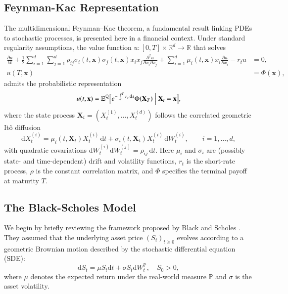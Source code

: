 \documentclass[12pt]{report} %
\theoremstyle{plain}           %
\theoremstyle{definition}      %
\theoremstyle{remark}          %
\begin{document}
\subsection{Feynman-Kac Representation}\label{sec:feynman_kac}

The multidimensional Feynman--Kac theorem, a fundamental result linking PDEs to 
stochastic processes, is presented here in a financial context.
Under standard regularity assumptions, the value function \(u:[0,T]\times\mathbb R^d\to\mathbb R\) that solves
\begin{equation}\label{eq:fk_pde_multi}
	\begin{aligned}
		\frac{\partial u}{\partial t}
		+ \frac{1}{2}\sum_{i=1}^{d}\sum_{j=1}^{d}
		    \rho_{ij}\sigma_i(t,\mathbf x)\sigma_j(t,\mathbf x)x_i x_j
		    \frac{\partial^{2}u}{\partial x_i\partial x_j}
		+ \sum_{i=1}^{d}\mu_i(t,\mathbf x)x_i\frac{\partial u}{\partial x_i}
		- r_t u &= 0,\\
		u(T,\mathbf x)&=\Phi(\mathbf x),
	\end{aligned}
\end{equation}
admits the probabilistic representation
\begin{equation}\label{eq:feynman_kac}
	u(t,\mathbf x)=
	\mathbb E^{\mathbb Q}\Bigl[
		e^{-\int_t^{T} r_s\,\mathrm ds}
		\Phi(\mathbf X_T)
		\Bigm| \mathbf X_t=\mathbf x
	\Bigr],
\end{equation}
where the state process \(\mathbf X_t=(X_t^{(1)},\ldots,X_t^{(d)})\) follows the correlated geometric It\^o diffusion
\begin{equation}\label{eq:general_sde}
	\mathrm dX_t^{(i)}
		=\mu_i(t,\mathbf X_t)X_t^{(i)}\,\mathrm dt
		+ \sigma_i(t,\mathbf X_t)X_t^{(i)}\,\mathrm dW_t^{(i)},
	\qquad i=1,\ldots,d,
\end{equation}
with quadratic covariations \(\mathrm dW_t^{(i)}\mathrm dW_t^{(j)}=\rho_{ij}\,\mathrm dt\).
Here \(\mu_i\) and \(\sigma_i\) are (possibly state- and time-dependent) drift and volatility functions, \(r_t\) is the short-rate
process, \(\rho\) is the constant correlation matrix, and
\(\Phi\) specifies the terminal payoff at maturity \(T\).

\subsection{The Black-Scholes Model}\label{sec:bs_dynamics}

We begin by briefly reviewing the framework proposed by Black and Scholes \cite{black1973}. They assumed that the
underlying asset price $(S_t)_{t\ge0}$ evolves according to a geometric Brownian motion described by the stochastic
differential equation (SDE):
\begin{equation}\label{eq:gbm_single_redux}
\mathrm{d}S_t = \mu S_t\mathrm{d}t + \sigma S_t\mathrm{d}W^{\mathbb{P}}_t,\quad S_0>0,
\end{equation}
where $\mu$ denotes the expected return under the real-world measure $\mathbb{P}$ and $\sigma$ is the asset volatility.
\end{document}
